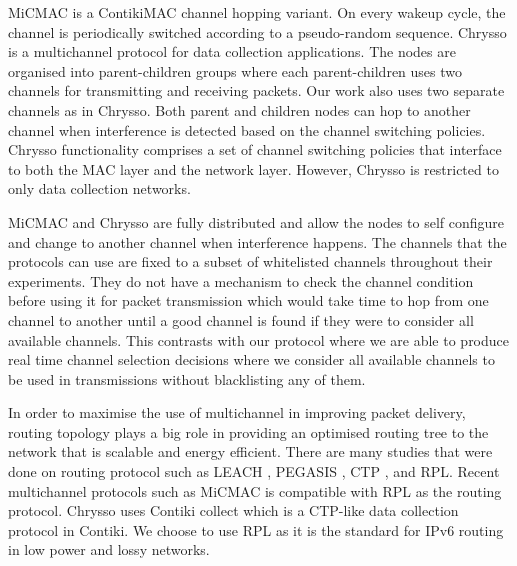 MiCMAC \cite{micmac} is a ContikiMAC \cite{contikimac} channel hopping variant. On every wakeup cycle, the channel is periodically switched according to a pseudo-random sequence. %
Chrysso \cite{chrysso} is a multichannel protocol for data collection applications. The nodes are organised into parent-children groups where each parent-children uses two channels for transmitting and receiving packets. Our work also uses two separate channels as in Chrysso. Both parent and children nodes can hop to another channel when interference is detected based on the channel switching policies. %
Chrysso functionality comprises a set of channel switching policies that interface to both the MAC layer and the network layer. However, Chrysso is restricted to only data collection networks.

MiCMAC and Chrysso are fully distributed and allow the nodes to self configure and change to another channel when interference happens. The channels that the protocols can use are fixed to a subset of whitelisted channels throughout their experiments. They do not have a mechanism to check the channel condition before using it for packet transmission which would take time to hop from one channel to another until a good channel is found if they were to consider all available channels. This contrasts with our protocol where we are able to produce real time channel selection decisions where we consider all available channels to be used in transmissions without blacklisting any of them. 



In order to maximise the use of multichannel in improving packet delivery, routing topology plays a big role in providing an optimised routing tree to the network that is scalable and energy efficient. There are many studies that were done on routing protocol such as LEACH \cite{leach}, PEGASIS \cite{pegasis}, CTP \cite{ctp}, and RPL. Recent multichannel protocols such as MiCMAC is compatible with RPL as the routing protocol. Chrysso uses Contiki collect which is a CTP-like data collection protocol in Contiki. We choose to use RPL as it is the standard for IPv6 routing in low power and lossy networks. 


